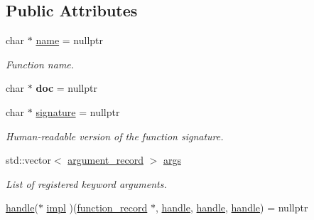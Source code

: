 \subsection*{Public Attributes}
\begin{DoxyCompactItemize}
\item 
char $\ast$ \hyperlink{structfunction__record_a55d760eb0046c3beec8a20d94ed1d07c}{name} = nullptr\hypertarget{structfunction__record_a55d760eb0046c3beec8a20d94ed1d07c}{}\label{structfunction__record_a55d760eb0046c3beec8a20d94ed1d07c}

\begin{DoxyCompactList}\small\item\em Function name. \end{DoxyCompactList}\item 
char $\ast$ {\bfseries doc} = nullptr\hypertarget{structfunction__record_a01cd5465d0e01d7f0995982b918efed4}{}\label{structfunction__record_a01cd5465d0e01d7f0995982b918efed4}

\item 
char $\ast$ \hyperlink{structfunction__record_aed1e3374bb684af2676d1aeb457c65b5}{signature} = nullptr\hypertarget{structfunction__record_aed1e3374bb684af2676d1aeb457c65b5}{}\label{structfunction__record_aed1e3374bb684af2676d1aeb457c65b5}

\begin{DoxyCompactList}\small\item\em Human-\/readable version of the function signature. \end{DoxyCompactList}\item 
std\+::vector$<$ \hyperlink{structargument__record}{argument\+\_\+record} $>$ \hyperlink{structfunction__record_abc060d33223e10553cb15c879e326ef5}{args}\hypertarget{structfunction__record_abc060d33223e10553cb15c879e326ef5}{}\label{structfunction__record_abc060d33223e10553cb15c879e326ef5}

\begin{DoxyCompactList}\small\item\em List of registered keyword arguments. \end{DoxyCompactList}\item 
\hyperlink{classhandle}{handle}($\ast$ \hyperlink{structfunction__record_af89b4e0169c4ada114314573dd838262}{impl} )(\hyperlink{structfunction__record}{function\+\_\+record} $\ast$, \hyperlink{classhandle}{handle}, \hyperlink{classhandle}{handle}, \hyperlink{classhandle}{handle}) = nullptr\hypertarget{structfunction__record_af89b4e0169c4ada114314573dd838262}{}\label{structfunction__record_af89b4e0169c4ada114314573dd838262}


\end{DoxyCompactItemize}
